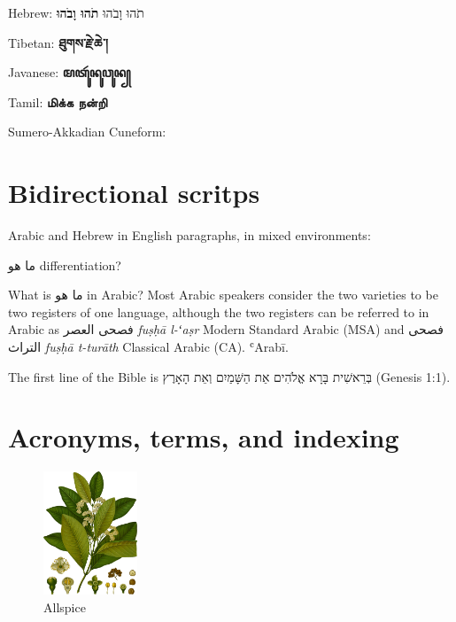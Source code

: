 \textnormal
Hebrew: תֹהוּ וָבֹהוּ \textbf{תֹהוּ וָבֹהוּ} 

Tibetan: { \textbf{ཐུགས་རྗེ་ཆེ་།}}

Javanese: { \textbf{ꦩꦠꦸꦂꦤꦸꦮꦸꦤ꧀}}

Tamil: { \textbf{மிக்க நன்றி}}

Sumero-Akkadian Cuneform: {\cuneifont{\GA \NU \UU \UM \Leftarrow \GI}}


\section{Bidirectional scritps}

Arabic and Hebrew in English paragraphs, in mixed environments:

ما هو \foreignlanguage{english}{differentiation}? 

What is ما هو in Arabic?
\medskip
\textnormal
\noindent Most Arabic speakers consider the two varieties to be two registers
of one language, although the two registers can be referred to in
Arabic as فصحى العصر \textit{fuṣḥā l-ʻaṣr} Modern Standard Arabic (MSA) and
فصحى التراث \textit{fuṣḥā t-turāth} Classical Arabic (CA). ʿArab\={i}.

\medskip

The first line of the Bible is בְּרֵאשִׁית בָּרָא אֱלֹהִים אֵת הַשָּׁמַיִם וְאֵת הָאָרֶץ (Genesis 1:1).






\section{Acronyms, terms, and indexing}

\begin{figure}
  \includegraphics[width=0.25\textwidth]{imgs/kohler/allspice_kohler_min.png}
  \caption{Allspice}
\end{figure}

